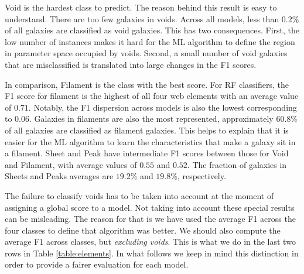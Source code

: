 \documentclass[usenatbib]{mnras}
\begin{document}
Void is the hardest class to predict. 
The reason behind this result is easy to understand. 
There are too few galaxies in voids.
Across all models, less than $0.2\%$ of all galaxies
are classified as void galaxies.
This has two consequences.
First, the low number of instances makes it hard for the ML algorithm to
define the region in parameter space occupied by voids.
Second, a small number of void galaxies that are misclassified is translated into large changes in the F1 scores.

In comparison, Filament is the class with the best score.
For RF classifiers, the F1 score for filament is the highest of all four
web elements with an average value of  $0.71$.
Notably, the F1 dispersion across models is also the lowest
corresponding to $0.06$.
Galaxies in filaments are also the most represented,
approximately $60.8\%$ of all galaxies are classified as filament galaxies.
This helps to explain that it is easier for the ML algorithm to learn
the characteristics that make a galaxy sit in a filament.
Sheet and Peak have intermediate F1 scores between
those for Void and Filament, with average values of $0.55$ and $0.52$.
The fraction of galaxies in Sheets and Peaks averages are $19.2\%$ and $19.8\%$, respectively. 

The failure to classify voids has to be taken into account at the
moment of assigning a global score to a model.
Not taking into account these special results can be misleading.
The reason for that is we have used the average F1 across the
four classes to define that algorithm was better. 
We should also compute the average F1 across classes, but
\emph{excluding voids}.
This is what we do in the last two rows in Table \ref{table:elements}.
In what follows we keep in mind this distinction in order to provide a
fairer evaluation for each model.
\end{document}
